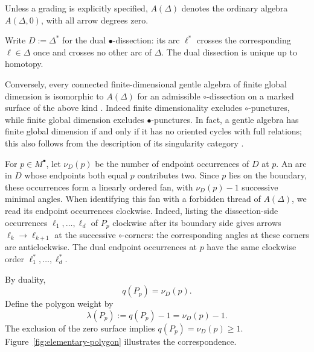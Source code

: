 \documentclass[11pt]{amsart}
\theoremstyle{definition}
\theoremstyle{plain}
\theoremstyle{definition}
\theoremstyle{definition}
\begin{document}
Unless a grading is explicitly specified, $A(\Delta)$ denotes
the ordinary algebra $A(\Delta,0)$, with all arrow degrees zero.

Write $D:=\Delta^*$ for the dual $\bullet$-dissection: its arc
$\ell^*$ crosses the corresponding $\ell\in\Delta$ once and
crosses no other arc of $\Delta$.  The dual dissection is unique
up to homotopy.


Conversely, every connected finite-dimensional gentle algebra of
finite global dimension is isomorphic to $A(\Delta)$ for an admissible
$\circ$-dissection on a marked surface of the above kind
\cite{OpperPlamondonSchroll}.
Indeed finite
dimensionality excludes $\circ$-punctures, while finite global dimension
excludes $\bullet$-punctures. In fact, a gentle algebra has finite global dimension if and only if
it has no oriented cycles with full relations; this also follows
from the description of its singularity category
\cite[Theorem~2.5]{Kalck2015}.

For $p\in M^\bullet$, let $\nu_D(p)$ be the number of endpoint
occurrences of $D$ at $p$.  An arc in $D$ whose endpoints both equal $p$
contributes two. Since $p$ lies on the boundary, these occurrences form a
linearly ordered fan, with $\nu_D(p)-1$ successive minimal angles.
When identifying this fan with a forbidden thread of $A(\Delta)$,
we read its endpoint occurrences clockwise.  Indeed, listing the
dissection-side occurrences $\ell_1,\ldots,\ell_d$ of $P_p$
clockwise after its boundary side gives arrows
$\ell_k\to\ell_{k+1}$ at the successive $\circ$-corners:
the corresponding angles at these corners are anticlockwise.
The dual endpoint occurrences at $p$ have the same
clockwise order $\ell_1^*,\ldots,\ell_d^*$.

By duality,
\begin{equation}
\label{eq:dual-valency}
 q(P_p)=\nu_D(p).
\end{equation}
Define the polygon weight by
\begin{equation}
\label{eq:polygon-weight}
 \lambda(P_p):=q(P_p)-1=\nu_D(p)-1.
\end{equation}
The exclusion of the zero surface implies $q(P_p)=\nu_D(p)\geq1$.
Figure~\ref{fig:elementary-polygon} illustrates the correspondence.
\end{document}
